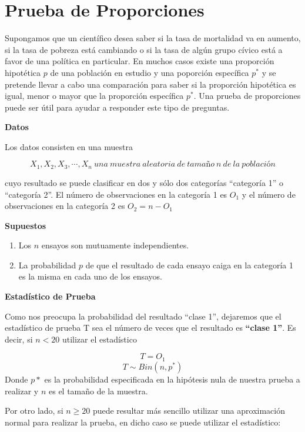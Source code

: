 \documentclass[a4paper,oneside,openany]{book}
\begin{document}
\chapter{Prueba de Proporciones}\label{prueba-de-proporciones}

Supongamos que un científico desea saber si la tasa de mortalidad va en
aumento, si la tasa de pobreza está cambiando o si la tasa de algún
grupo cívico está a favor de una política en particular. En muchos casos
existe una proporción hipotética \(p\) de una población en estudio y una
poporción específica \(p^*\) y se pretende llevar a cabo una comparación
para saber si la proporción hipotética es igual, menor o mayor que la
proporción específica \(p^*\). Una prueba de proporciones puede ser útil
para ayudar a responder este tipo de preguntas.

\textbf{Datos}

Los datos consisten en una muestra

\[X_{1},X_{2},X_{3},\cdots,X_{n}  \ una \ muestra \ aleatoria \ de \ tamaño \ n \ de \ la \ población\]

cuyo resultado se puede clasificar en dos y sólo dos categorías
``categoría 1'' o ``categoría 2''. El número de observaciones en la
categoría 1 es \(O_{1}\) y el número de observaciones en la categoría 2
es \(O_{2}=n-O_{1}\)

\textbf{Supuestos}

\begin{enumerate}
\def\labelenumi{\arabic{enumi})}
\item
  Los \(n\) ensayos son mutuamente independientes.
\item
  La probabilidad \(p\) de que el resultado de cada ensayo caiga en la
  categoría 1 es la misma en cada uno de los ensayos.
\end{enumerate}

\textbf{Estadístico de Prueba}

Como nos preocupa la probabilidad del resultado ``clase 1'', dejaremos
que el estadístico de prueba T sea el número de veces que el resultado
es \textbf{``clase 1''}. Es decir, si \(n<20\) utilizar el estadístico

\[T=O_{1}\] \[ T \sim Bin (n,p^*)\] Donde \(p*\) es la probabilidad
especificada en la hipótesis nula de nuestra prueba a realizar y \(n\)
es el tamaño de la muestra.

Por otro lado, si \(n\geq20\) puede resultar más sencillo utilizar una
aproximación normal para realizar la prueba, en dicho caso se puede
utilizar el estadístico:
\end{document}
